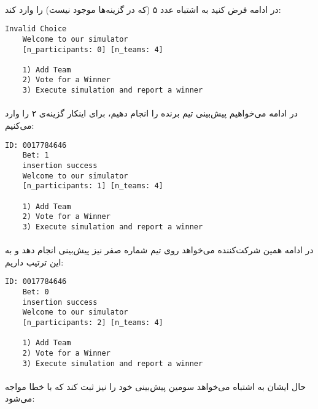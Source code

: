 \documentclass[../main.tex]{subfiles}
\begin{document}
\paragraph{}
در ادامه فرض کنید به اشتباه عدد ۵ (که در گزینه‌ها موجود نیست) را وارد کند:


\begin{latin}
\begin{lstlisting}[]
    Invalid Choice
    Welcome to our simulator
    [n_participants: 0] [n_teams: 4]

    1) Add Team
    2) Vote for a Winner
    3) Execute simulation and report a winner
\end{lstlisting}
\end{latin}

\paragraph{}
در ادامه می‌خواهیم پیش‌بینی تیم برنده را انجام دهیم، برای اینکار گزینه‌ی ۲ را وارد می‌کنیم:



\begin{latin}
\begin{lstlisting}[]
    ID: 0017784646
    Bet: 1
    insertion success
    Welcome to our simulator
    [n_participants: 1] [n_teams: 4]

    1) Add Team
    2) Vote for a Winner
    3) Execute simulation and report a winner
\end{lstlisting}
\end{latin}

\paragraph{}
در ادامه همین شرکت‌کننده می‌خواهد روی تیم شماره صفر نیز پیش‌بینی انجام دهد و به این ترتیب داریم:


\begin{latin}
\begin{lstlisting}[]
    ID: 0017784646
    Bet: 0
    insertion success
    Welcome to our simulator
    [n_participants: 2] [n_teams: 4]

    1) Add Team
    2) Vote for a Winner
    3) Execute simulation and report a winner
\end{lstlisting}
\end{latin}

\paragraph{}
حال ایشان به اشتباه می‌خواهد سومین پیش‌بینی خود را نیز ثبت کند که با خطا مواجه می‌شود:
\end{document}
